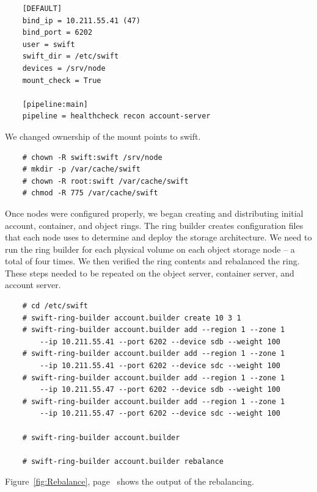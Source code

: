 \documentclass{article}
\begin{document}
\begin{verbatim}
    [DEFAULT]
    bind_ip = 10.211.55.41 (47)
    bind_port = 6202
    user = swift
    swift_dir = /etc/swift
    devices = /srv/node
    mount_check = True

    [pipeline:main]
    pipeline = healthcheck recon account-server
\end{verbatim}

We changed ownership of the mount points to swift.

\begin{verbatim}
    # chown -R swift:swift /srv/node
    # mkdir -p /var/cache/swift
    # chown -R root:swift /var/cache/swift
    # chmod -R 775 /var/cache/swift
\end{verbatim}

Once nodes were configured properly, we began creating and distributing initial account, container, and object rings. The ring builder creates configuration files that each node uses to determine and deploy the storage architecture. We need to run the ring builder for each physical volume on each object storage node -- a total of four times. We then verified the ring contents and rebalanced the ring. These steps needed to be repeated on the object server, container server, and account server.

\begin{verbatim}
    # cd /etc/swift
    # swift-ring-builder account.builder create 10 3 1
    # swift-ring-builder account.builder add --region 1 --zone 1 
        --ip 10.211.55.41 --port 6202 --device sdb --weight 100
    # swift-ring-builder account.builder add --region 1 --zone 1 
        --ip 10.211.55.41 --port 6202 --device sdc --weight 100
    # swift-ring-builder account.builder add --region 1 --zone 1 
        --ip 10.211.55.47 --port 6202 --device sdb --weight 100
    # swift-ring-builder account.builder add --region 1 --zone 1 
        --ip 10.211.55.47 --port 6202 --device sdc --weight 100
    
    # swift-ring-builder account.builder

    # swift-ring-builder account.builder rebalance
\end{verbatim}

Figure~\ref{fig:Rebalance}, page~\pageref{fig:Rebalance} shows the output of the rebalancing.
\end{document}
